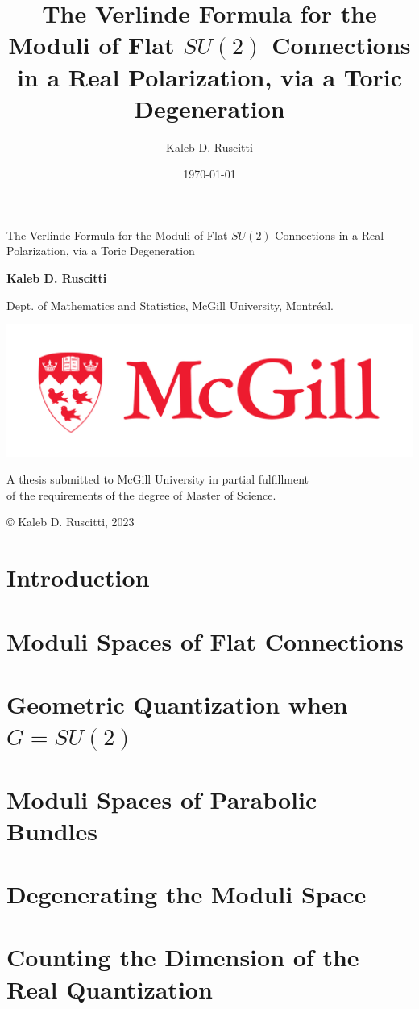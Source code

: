 \documentclass[]{report}
\title{The Verlinde Formula for the Moduli of Flat $SU(2)$ Connections in a Real Polarization, via a Toric Degeneration}
\date{\today}
\author{Kaleb D. Ruscitti}
\numberwithin{theorem}{chapter}
\begin{document}
	
\begin{titlepage}
	\begin{center}
		\vspace*{1cm}
		
		{\Large The Verlinde Formula for the Moduli of Flat $SU(2)$ Connections in a Real Polarization, via a Toric Degeneration}
		
		\vspace{2cm}
		\textbf{Kaleb D. Ruscitti}
		
		\vspace{0.5 cm}
		Dept. of Mathematics and Statistics, McGill University, Montréal.
		
		\vfill
		
		\includegraphics{mcgill_sig_red.png}
	
		
		A thesis submitted to McGill University in partial fulfillment \\
		 of the requirements of the degree of Master of Science.
		
		\vspace{0.5 cm}
		{\footnotesize © Kaleb D. Ruscitti, 2023}
	\end{center}
\end{titlepage}
\tableofcontents



\chapter{Introduction}
\label{s:intro}

\chapter{Moduli Spaces of Flat Connections}
\label{s:background}

\chapter{Geometric Quantization when $G=SU(2)$}
\label{s:jeffreyweitsman}

\chapter{Moduli Spaces of Parabolic Bundles}
\label{s:mastermoduli}

\chapter{Degenerating the Moduli Space}
\label{s:degeneration}

\chapter{Counting the Dimension of the Real Quantization}
\label{s:result}


\pagebreak
\printbibliography
\end{document}
